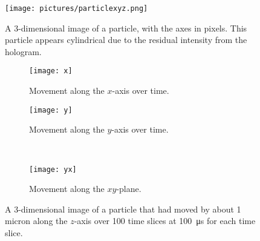 \begin{figure}[ht!]
    \begin{center}

        \texttt{[image: pictures/particlexyz.png]}


    \end{center}
    \caption{%
        A 3-dimensional image of a particle, with the axes in
        pixels. This particle appears cylindrical due to the residual intensity
        from the hologram.
    }%
    \label{fig:3Dparticle}
\end{figure}

\begin{figure}[ht!]
    \begin{center}

        \begin{subfigure}[t]{0.4\textwidth}
            \label{fig:3Dx}
            \texttt{[image: x]}
            \caption{Movement along the $x$-axis over time.}
        \end{subfigure}
        \hspace*{\fill}
        \begin{subfigure}[t]{0.4\textwidth}
            \label{fig:3Dy}
            \texttt{[image: y]}
            \caption{Movement along the $y$-axis over time.}
        \end{subfigure}
        \\
        \begin{subfigure}[t]{0.6\textwidth}
            \label{fig:3Dyx}
            \texttt{[image: yx]}
            \caption{Movement along the $xy$-plane.}
        \end{subfigure}


    \end{center}
    \caption{%
        A 3-dimensional image of a particle that had moved by about 1 micron
        along the $z$-axis over 100 time slices at \SI{100}{\micro\second} for
        each time slice.
    }%
    \label{fig:3D}
\end{figure}

